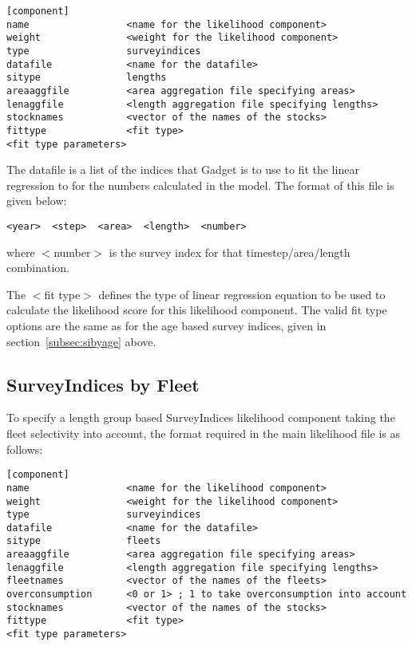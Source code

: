 \documentclass [a4paper, 10pt]{book}
\begin{document}
{\small\begin{verbatim}
[component]
name                 <name for the likelihood component>
weight               <weight for the likelihood component>
type                 surveyindices
datafile             <name for the datafile>
sitype               lengths
areaaggfile          <area aggregation file specifying areas>
lenaggfile           <length aggregation file specifying lengths>
stocknames           <vector of the names of the stocks>
fittype              <fit type>
<fit type parameters>
\end{verbatim}}

The datafile is a list of the indices that Gadget is to use to fit the linear regression to for the numbers calculated in the model.  The format of this file is given below:

{\small\begin{verbatim}
<year>  <step>  <area>  <length>  <number>
\end{verbatim}}

where $<$number$>$ is the survey index for that timestep/area/length combination.

\bigskip
The $<$fit type$>$ defines the type of linear regression equation to be used to calculate the likelihood score for this likelihood component.  The valid fit type options are the same as for the age based survey indices, given in section~\ref{subsec:sibyage} above.

\subsection{SurveyIndices by Fleet}\label{subsec:sibyfleet}
To specify a length group based SurveyIndices likelihood component taking the fleet selectivity into account, the format required in the main likelihood file is as follows:

{\small\begin{verbatim}
[component]
name                 <name for the likelihood component>
weight               <weight for the likelihood component>
type                 surveyindices
datafile             <name for the datafile>
sitype               fleets
areaaggfile          <area aggregation file specifying areas>
lenaggfile           <length aggregation file specifying lengths>
fleetnames           <vector of the names of the fleets>
overconsumption      <0 or 1> ; 1 to take overconsumption into account
stocknames           <vector of the names of the stocks>
fittype              <fit type>
<fit type parameters>
\end{verbatim}}
\end{document}
